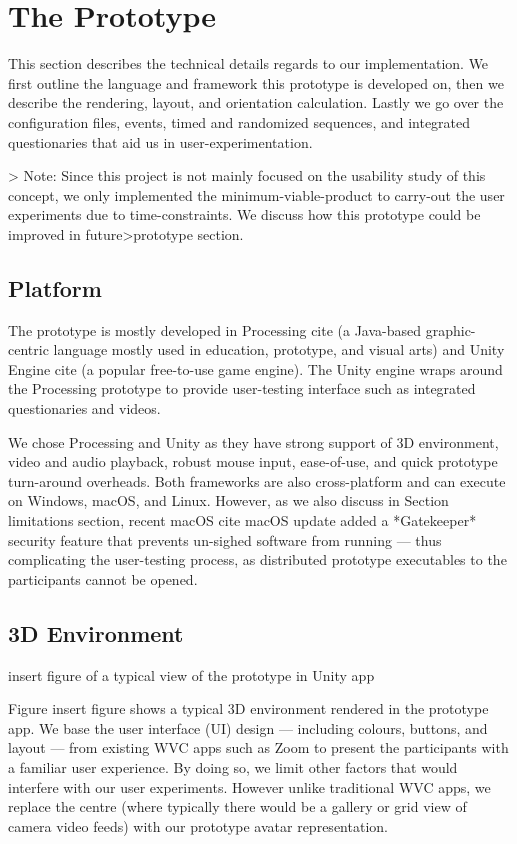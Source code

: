 \section{The Prototype}

This section describes the technical details regards to our implementation. We first outline the language and framework this prototype is developed on, then we describe the rendering, layout, and orientation calculation. Lastly we go over the configuration files, events, timed and randomized sequences, and integrated questionaries that aid us in user-experimentation.

> Note: Since this project is not mainly focused on the usability study of this concept, we only implemented the minimum-viable-product to carry-out the user experiments due to time-constraints. We discuss how this prototype could be improved in future>prototype section.

\subsection{Platform}

The prototype is mostly developed in Processing cite (a Java-based graphic-centric language mostly used in education, prototype, and visual arts) and Unity Engine cite (a popular free-to-use game engine). The Unity engine wraps around the Processing prototype to provide user-testing interface such as integrated questionaries and videos.

We chose Processing and Unity as they have strong support of 3D environment, video and audio playback, robust mouse input, ease-of-use, and quick prototype turn-around overheads. Both frameworks are also cross-platform and can execute on Windows, macOS, and Linux. However, as we also discuss in Section limitations section, recent macOS cite macOS update added a *Gatekeeper* security feature that prevents un-sighed software from running --- thus complicating the user-testing process, as distributed prototype executables to the participants cannot be opened.

\subsection{3D Environment}

insert figure of a typical view of the prototype in Unity app

Figure insert figure shows a typical 3D environment rendered in the prototype app. We base the user interface (UI) design --- including colours, buttons, and layout --- from existing WVC apps such as Zoom to present the participants with a familiar user experience. By doing so, we limit other factors that would interfere with our user experiments. However unlike traditional WVC apps, we replace the centre (where typically there would be a gallery or grid view of camera video feeds) with our prototype avatar representation.

